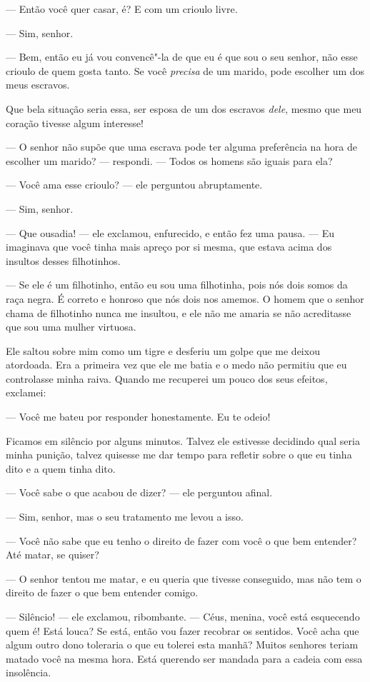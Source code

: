 --- Então você quer casar, é? E com um
crioulo livre.

--- Sim, senhor.

--- Bem, então eu já vou convencê"-la de
que eu é que sou o seu senhor, não esse crioulo de quem gosta tanto. Se
você \emph{precisa} de um marido, pode escolher um dos meus escravos.

Que bela situação seria essa, ser
esposa de um dos escravos \emph{dele}, mesmo que meu coração tivesse
algum interesse!

--- O senhor não supõe que uma escrava
pode ter alguma preferência na hora de escolher um marido? --- respondi.
--- Todos os homens são iguais para ela?

--- Você ama esse crioulo? --- ele
perguntou abruptamente.

--- Sim, senhor.

--- Que ousadia! --- ele exclamou,
enfurecido, e então fez uma pausa. --- Eu imaginava que você tinha mais
apreço por si mesma, que estava acima dos insultos desses filhotinhos.

--- Se ele é um filhotinho, então eu
sou uma filhotinha, pois nós dois somos da raça negra. É correto e
honroso que nós dois nos amemos. O homem que o senhor chama de
filhotinho nunca me insultou, e ele não me amaria se não acreditasse que
sou uma mulher virtuosa.

Ele saltou sobre mim como um tigre e
desferiu um golpe que me deixou atordoada. Era a primeira vez que ele me
batia e o medo não permitiu que eu controlasse minha raiva. Quando me
recuperei um pouco dos seus efeitos, exclamei:

--- Você me bateu por responder honestamente. Eu te odeio!

Ficamos em silêncio por alguns minutos.
Talvez ele estivesse decidindo qual seria minha punição, talvez quisesse
me dar tempo para refletir sobre o que eu tinha dito e a quem tinha
dito.

--- Você sabe o que acabou de dizer? --- ele perguntou afinal.

--- Sim, senhor, mas o seu tratamento
me levou a isso.

--- Você não sabe que eu tenho o
direito de fazer com você o que bem entender? Até matar, se quiser?

--- O senhor tentou me matar, e eu
queria que tivesse conseguido, mas não tem o direito de fazer o que bem
entender comigo.

--- Silêncio! --- ele exclamou,
ribombante. --- Céus, menina, você está esquecendo quem é! Está louca?
Se está, então vou fazer recobrar os sentidos. Você acha que algum outro
dono toleraria o que eu tolerei esta manhã? Muitos senhores teriam
matado você na mesma hora. Está querendo ser mandada para a cadeia com
essa insolência.

